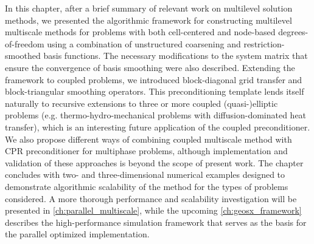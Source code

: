 In this chapter, after a brief summary of relevant work on multilevel solution methods, we presented the algorithmic framework for constructing multilevel multiscale methods for problems with both cell-centered and node-based degrees-of-freedom using a combination of unstructured coarsening and restriction-smoothed basis functions.   The necessary modifications to the system matrix that ensure the convergence of basis smoothing were also described.   Extending the framework to coupled problems, we introduced block-diagonal grid transfer and block-triangular smoothing operators.   This preconditioning template lends itself naturally to recursive extensions to three or more coupled (quasi-)elliptic problems (e.g. thermo-hydro-mechanical problems with diffusion-dominated heat transfer), which is an interesting future application of the coupled preconditioner.   We also propose different ways of combining coupled multiscale method with CPR preconditioner for multiphase problems, although implementation and validation of these approaches is beyond the scope of present work.   The chapter concludes with two- and three-dimensional numerical examples designed to demonstrate algorithmic scalability of the method for the types of problems considered.   A more thorough performance and scalability investigation will be presented in \cref{ch:parallel_multiscale}, while the upcoming \cref{ch:geosx_framework} describes the high-performance simulation framework that serves as the basis for the parallel optimized implementation.